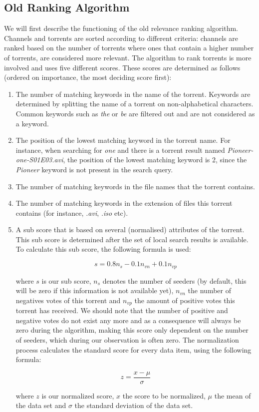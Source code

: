 \subsection{Old Ranking Algorithm}
We will first describe the functioning of the old relevance ranking algorithm. Channels and torrents are sorted according to different criteria: channels are ranked based on the number of torrents where ones that contain a higher number of torrents, are considered more relevant. The algorithm to rank torrents is more involved and uses five different scores. These scores are determined as follows (ordered on importance, the most deciding score first):
\begin{enumerate}
	\item The number of matching keywords in the name of the torrent. Keywords are determined by splitting the name of a torrent on non-alphabetical characters. Common keywords such as \emph{the} or \emph{be} are filtered out and are not considered as a keyword.
	\item The position of the lowest matching keyword in the torrent name. For instance, when searching for \emph{one} and there is a torrent result named \emph{Pioneer-one-S01E03.avi}, the position of the lowest matching keyword is 2, since the \emph{Pioneer} keyword is not present in the search query.
	\item The number of matching keywords in the file names that the torrent contains.
	\item The number of matching keywords in the extension of files this torrent contains (for instance, \emph{.avi}, \emph{.iso} etc).
	\item A sub score that is based on several (normalised) attributes of the torrent. This sub score is determined after the set of local search results is available. To calculate this sub score, the following formula is used: 
	
	\begin{equation}
	\label{eq:score-old-ranking-5}
	s = 0.8n_s - 0.1n_{vn} + 0.1n_{vp}
	\end{equation}
	
	 where $ s $ is our sub score, $ n_s $ denotes the number of seeders (by default, this will be zero if this information is not available yet), $ n_{vn} $ the number of negatives votes of this torrent and $ n_{vp} $ the amount of positive votes this torrent has received. We should note that the number of positive and negative votes do not exist any more and as a consequence will always be zero during the algorithm, making this score only dependent on the number of seeders, which during our observation is often zero. The normalization process calculates the standard score for every data item, using the following formula:
	
	\begin{equation}
	\label{eq:normalization-standard-score}
	z = \frac{x - \mu}{\sigma}
	\end{equation}
	
	where $ z $ is our normalized score, $ x $ the score to be normalized, $ \mu $ the mean of the data set and $ \sigma $ the standard deviation of the data set.
	
\end{enumerate}
